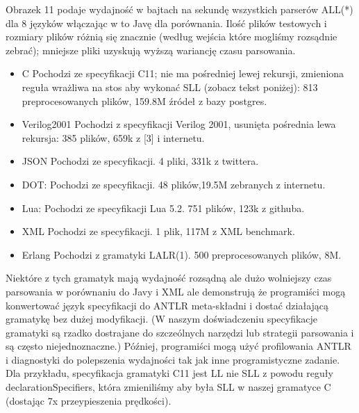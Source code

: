 Obrazek 11 podaje wydajność w bajtach na sekundę wszystkich parserów ALL(*)
dla 8 języków włączając w to Javę dla porównania. Ilość plików testowych
i rozmiary plików różnią się znacznie (według wejścia które mogliśmy rozsądnie zebrać);
mniejsze pliki uzyskują wyższą wariancję czasu parsowania.
\begin{itemize}
\item C Pochodzi ze specyfikacji C11; nie ma pośredniej lewej rekursji,
zmieniona reguła wrażliwa na stos aby  wykonać SLL (zobacz tekst poniżej): 813
preprocesowanych plików, 159.8M źródeł z bazy postgres.
\item Verilog2001 Pochodzi z specyfikacji Verilog 2001, usunięta pośrednia lewa rekursja:
385 plików, 659k z [3] i internetu.
\item JSON Pochodzi ze specyfikacji. 4 pliki, 331k z twittera.
\item DOT: Pochodzi ze specyfikacji. 48 plików,19.5M zebranych z internetu.
\item Lua: Pochodzi ze specyfikacji Lua 5.2. 751 plików, 123k z githuba.
\item XML Pochodzi ze specyfikacji. 1 plik, 117M z XML benchmark.
\item Erlang Pochodzi z gramatyki LALR(1). 500 preprocesowanych plików, 8M.
\end{itemize}
Niektóre z tych gramatyk mają wydajność rozsądną ale dużo wolniejszy czas parsowania w
porównaniu do Javy i XML ale demonstrują że programiści mogą konwertować język
specyfikacji do ANTLR meta-składni
i dostać działającą gramatykę bez dużej modyfikacji.
(W naszym doświadczeniu specyfikacje gramatyki są rzadko dostrajane do szczeólnych narzędzi lub strategii parsowania i są często niejednoznaczne.) Później, programiści mogą użyć profilowania ANTLR i diagnostyki do polepszenia wydajności tak jak inne programistyczne zadanie.
Dla przykładu, specyfikacja gramatyki C11 jest LL nie SLL
z powodu reguły declarationSpecifiers, która zmieniliśmy aby była SLL w naszej gramatyce C (dostając 7x przeypieszenia prędkości).
